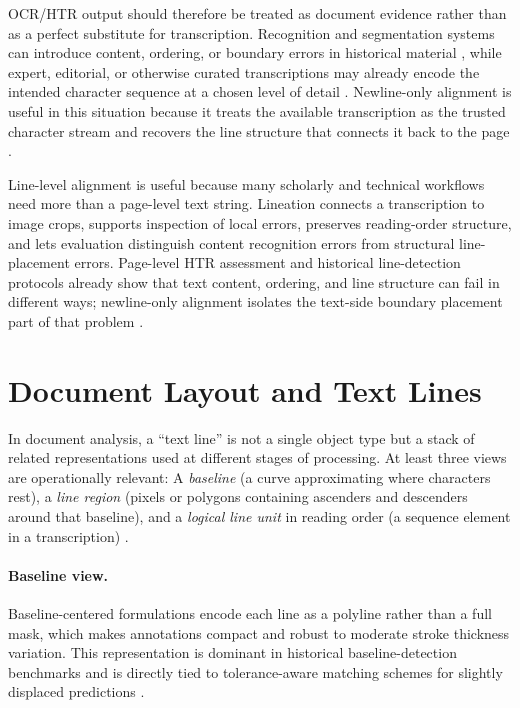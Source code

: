 OCR/HTR output should therefore be treated as document evidence rather than as a perfect substitute for transcription. Recognition and segmentation systems can introduce content, ordering, or boundary errors in historical material , while expert, editorial, or otherwise curated transcriptions may already encode the intended character sequence at a chosen level of detail . Newline-only alignment is useful in this situation because it treats the available transcription as the trusted character stream and recovers the line structure that connects it back to the page .

Line-level alignment is useful because many scholarly and technical workflows need more than a page-level text string. Lineation connects a transcription to image crops, supports inspection of local errors, preserves reading-order structure, and lets evaluation distinguish content recognition errors from structural line-placement errors. Page-level HTR assessment and historical line-detection protocols already show that text content, ordering, and line structure can fail in different ways; newline-only alignment isolates the text-side boundary placement part of that problem .

\section{Document Layout and Text Lines}
\label{sec:theory_layout_lines}

In document analysis, a ``text line'' is not a single object type but a stack of related representations used at different stages of processing. At least three views are operationally relevant: A \emph{baseline} (a curve approximating where characters rest), a \emph{line region} (pixels or polygons containing ascenders and descenders around that baseline), and a \emph{logical line unit} in reading order (a sequence element in a transcription) .

\paragraph{Baseline view.}
Baseline-centered formulations encode each line as a polyline rather than a full mask, which makes annotations compact and robust to moderate stroke thickness variation. This representation is dominant in historical baseline-detection benchmarks and is directly tied to tolerance-aware matching schemes for slightly displaced predictions .

